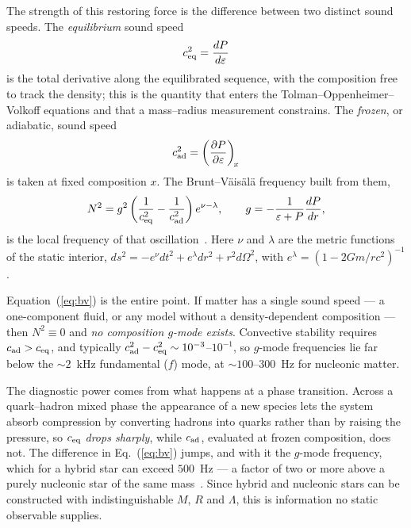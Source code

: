 \documentclass[aps,prd,twocolumn,superscriptaddress,nofootinbib,10pt]{revtex4-2}
\begin{document}
The strength of this restoring force is the difference between two distinct
sound speeds. The \emph{equilibrium} sound speed
\begin{equation}
  c_{\rm eq}^{2} = \frac{dP}{d\varepsilon}
\end{equation}
is the total derivative along the equilibrated sequence, with the composition
free to track the density; this is the quantity that enters the
Tolman--Oppenheimer--Volkoff equations and that a mass--radius measurement
constrains. The \emph{frozen}, or adiabatic, sound speed
\begin{equation}
  c_{\rm ad}^{2} = \left(\frac{\partial P}{\partial \varepsilon}\right)_{\!x}
\end{equation}
is taken at fixed composition $x$. The Brunt--V\"ais\"al\"a frequency built from
them,
\begin{equation}
  N^{2} = g^{2}\left(\frac{1}{c_{\rm eq}^{2}}
                   - \frac{1}{c_{\rm ad}^{2}}\right) e^{\nu-\lambda},
  \qquad g = -\frac{1}{\varepsilon+P}\frac{dP}{dr},
  \label{eq:bv}
\end{equation}
is the local frequency of that oscillation~\cite{Jaikumar2021}. Here $\nu$ and
$\lambda$ are the metric functions of the static interior,
$ds^{2}=-e^{\nu}dt^{2}+e^{\lambda}dr^{2}+r^{2}d\Omega^{2}$, with
$e^{\lambda}=(1-2Gm/rc^{2})^{-1}$.

Equation~(\ref{eq:bv}) is the entire point. If matter has a single sound speed
--- a one-component fluid, or any model without a density-dependent composition
--- then $N^{2}\equiv0$ and \emph{no composition $g$-mode exists}. Convective
stability requires $c_{\rm ad}>c_{\rm eq}$, and typically
$c_{\rm ad}^{2}-c_{\rm eq}^{2}\sim10^{-3}$--$10^{-1}$, so $g$-mode frequencies
lie far below the $\sim2$~kHz fundamental ($f$) mode, at
$\sim100$--$300$~Hz for nucleonic matter.

The diagnostic power comes from what happens at a phase transition. Across a
quark--hadron mixed phase the appearance of a new species lets the system absorb
compression by converting hadrons into quarks rather than by raising the
pressure, so $c_{\rm eq}$ \emph{drops sharply}, while $c_{\rm ad}$, evaluated at
frozen composition, does not. The difference in Eq.~(\ref{eq:bv}) jumps, and
with it the $g$-mode frequency, which for a hybrid star can exceed $500$~Hz ---
a factor of two or more above a purely nucleonic star of the same
mass~\cite{Jaikumar2021,Constantinou2021}. Since hybrid and nucleonic stars can
be constructed with indistinguishable $M$, $R$ and $\Lambda$, this is
information no static observable supplies.
\end{document}
